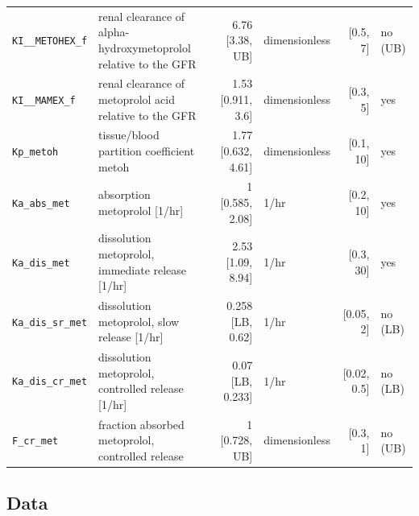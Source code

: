\documentclass{article}
\begin{document}
\begin{longtable}{llrlrl}
\texttt{KI\_\_METOHEX\_f} & renal clearance of alpha-hydroxymetoprolol relative to the GFR & 6.76 [3.38, UB] & dimensionless & [0.5, 7] & no (UB) \\
\texttt{KI\_\_MAMEX\_f} & renal clearance of metoprolol acid relative to the GFR & 1.53 [0.911, 3.6] & dimensionless & [0.3, 5] & yes \\
\texttt{Kp\_metoh} & tissue/blood partition coefficient metoh & 1.77 [0.632, 4.61] & dimensionless & [0.1, 10] & yes \\
\texttt{Ka\_abs\_met} & absorption metoprolol [1/hr] & 1 [0.585, 2.08] & 1/hr & [0.2, 10] & yes \\
\texttt{Ka\_dis\_met} & dissolution metoprolol, immediate release [1/hr] & 2.53 [1.09, 8.94] & 1/hr & [0.3, 30] & yes \\
\texttt{Ka\_dis\_sr\_met} & dissolution metoprolol, slow release [1/hr] & 0.258 [LB, 0.62] & 1/hr & [0.05, 2] & no (LB) \\
\texttt{Ka\_dis\_cr\_met} & dissolution metoprolol, controlled release [1/hr] & 0.07 [LB, 0.233] & 1/hr & [0.02, 0.5] & no (LB) \\
\texttt{F\_cr\_met} & fraction absorbed metoprolol, controlled release & 1 [0.728, UB] & dimensionless & [0.3, 1] & no (UB) \\
\end{longtable}

\subsection{Data}
\end{document}
